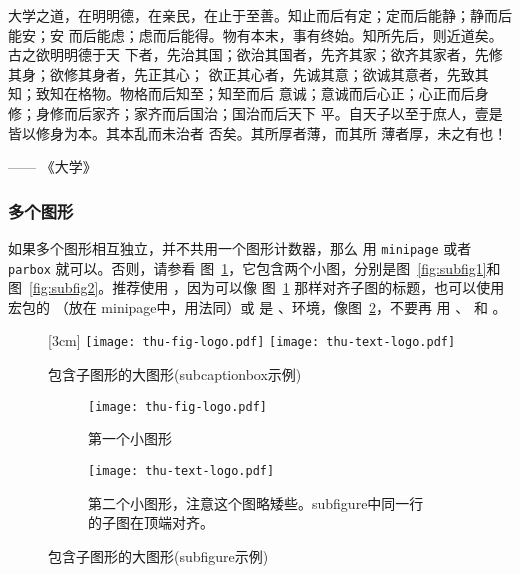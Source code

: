 大学之道，在明明德，在亲民，在止于至善。知止而后有定；定而后能静；静而后能安；安
而后能虑；虑而后能得。物有本末，事有终始。知所先后，则近道矣。古之欲明明德于天
下者，先治其国；欲治其国者，先齐其家；欲齐其家者，先修其身；欲修其身者，先正其心；
欲正其心者，先诚其意；欲诚其意者，先致其知；致知在格物。物格而后知至；知至而后
意诚；意诚而后心正；心正而后身 修；身修而后家齐；家齐而后国治；国治而后天下
平。自天子以至于庶人，壹是皆以修身为本。其本乱而未治者 否矣。其所厚者薄，而其所
薄者厚，未之有也！

\hfill —— 《大学》


\subsubsection{多个图形}
\label{sec:multifig}

如果多个图形相互独立，并不共用一个图形计数器，那么
用 \texttt{minipage} 或者\texttt{parbox} 就可以。否则，请参看
图~\ref{fig:big1-subcaptionbox}，它包含两个小图，分别是图~\ref{fig:subfig1}和
图~\ref{fig:subfig2}。推荐使用 ，因为可以像
图~\ref{fig:big1-subcaptionbox} 那样对齐子图的标题，也可以使用 
宏包的 （放在 minipage中，用法同）或
是  、环境，像图~\ref{fig:big1-subfigure}，不要再
用 、 和 。

\begin{figure}[h]
  \centering%
  [3cm] %
    {\texttt{[image: thu-fig-logo.pdf]}}%
  \hspace{4em}%
      {\texttt{[image: thu-text-logo.pdf]}}
  \caption{包含子图形的大图形(subcaptionbox示例)}
  \label{fig:big1-subcaptionbox}
\end{figure}
\begin{figure}[h]
  \centering%
  \begin{subfigure}{3cm}
    \texttt{[image: thu-fig-logo.pdf]}
    \caption{第一个小图形}
  \end{subfigure}%
  \hspace{4em}%
  \begin{subfigure}{0.5\textwidth}
    \texttt{[image: thu-text-logo.pdf]}
    \caption{第二个小图形，注意这个图略矮些。subfigure中同一行的子图在顶端对齐。}
  \end{subfigure}
  \caption{包含子图形的大图形(subfigure示例)}
  \label{fig:big1-subfigure}
\end{figure}

